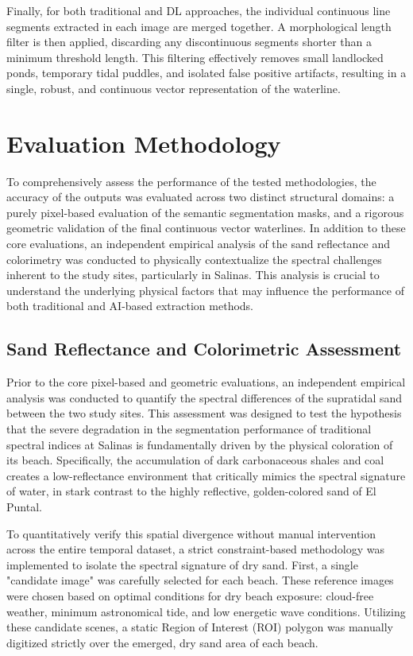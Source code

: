 ﻿\documentclass[ENG]{TFUOC}%
\begin{document}

Finally, for both traditional and DL approaches, the individual continuous line segments extracted in each image are merged together. A morphological length filter is then applied, discarding any discontinuous segments shorter than a minimum threshold length. This filtering effectively removes small landlocked ponds, temporary tidal puddles, and isolated false positive artifacts, resulting in a single, robust, and continuous vector representation of the waterline.

\section{Evaluation Methodology}
\label{sec:evaluation_methodology}

To comprehensively assess the performance of the tested methodologies, the accuracy of the outputs was evaluated across two distinct structural domains: a purely pixel-based evaluation of the semantic segmentation masks, and a rigorous geometric validation of the final continuous vector waterlines. In addition to these core evaluations, an independent empirical analysis of the sand reflectance and colorimetry was conducted to physically contextualize the spectral challenges inherent to the study sites, particularly in Salinas. This analysis is crucial to understand the underlying physical factors that may influence the performance of both traditional and AI-based extraction methods.

\subsection{Sand Reflectance and Colorimetric Assessment}
\label{sec:sand_reflectance}

Prior to the core pixel-based and geometric evaluations, an independent empirical analysis was conducted to quantify the spectral differences of the supratidal sand between the two study sites. This assessment was designed to test the hypothesis that the severe degradation in the segmentation performance of traditional spectral indices at Salinas is fundamentally driven by the physical coloration of its beach. Specifically, the accumulation of dark carbonaceous shales and coal creates a low-reflectance environment that critically mimics the spectral signature of water, in stark contrast to the highly reflective, golden-colored sand of El Puntal.

To quantitatively verify this spatial divergence without manual intervention across the entire temporal dataset, a strict constraint-based methodology was implemented to isolate the spectral signature of dry sand. First, a single "candidate image" was carefully selected for each beach. These reference images were chosen based on optimal conditions for dry beach exposure: cloud-free weather, minimum astronomical tide, and low energetic wave conditions. Utilizing these candidate scenes, a static Region of Interest (ROI) polygon was manually digitized strictly over the emerged, dry sand area of each beach.
\end{document}
